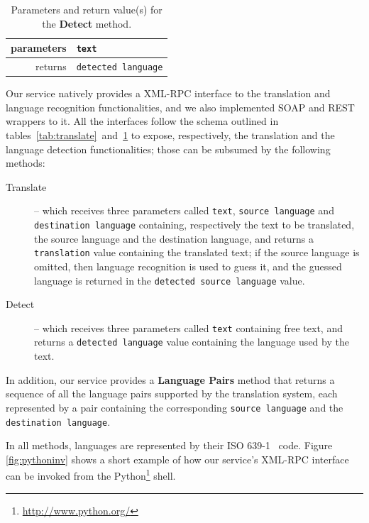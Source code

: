 \documentclass[11pt]{article}
\begin{document}
\begin{table}[!ht]
\begin{center}
 \begin{tabular}{|r|l|}
  \hline
   parameters	& {\tt\small text} \\
  \hline \hline
   returns 	& {\tt\small detected language}\\
  \hline
 \end{tabular}
\end{center}
\caption{Parameters and return value(s) for the {\bf Detect} method.}
\label{tab:detect}
\end{table}

Our service natively provides a XML-RPC interface to the translation and language recognition functionalities, and we also implemented SOAP and REST wrappers to it. All the interfaces follow the schema outlined in tables~\ref{tab:translate}~and~\ref{tab:detect} to expose, respectively, the translation and the language detection functionalities; those can be subsumed by the following methods:

\begin{description}
 \item[Translate] -- which receives three parameters called {\tt\small text}, {\tt\small source language} and {\tt\small destination language} containing, respectively the text to be translated, the source language and the destination language, and returns a {\tt\small translation} value containing the translated text; if the source language is omitted, then language recognition is used to guess it, and the guessed language is returned in the {\tt\small detected source language} value.
 \item[Detect] -- which receives three parameters called {\tt\small text} containing free text, and returns a {\tt\small detected language} value containing the language used by the text.
\end{description}

In addition, our service provides a {\bf Language Pairs} method that returns a sequence of all the language pairs supported by the translation system, each represented by a pair containing the corresponding {\tt\small source language} and the {\tt\small destination language}.

In all methods, languages are represented by their ISO 639-1~\citep{ISO:639-1} code. Figure \ref{fig:pythoninv} shows a short example of how our service's XML-RPC interface can be invoked from the Python\footnote{\small\url{http://www.python.org/}} shell.
\end{document}
